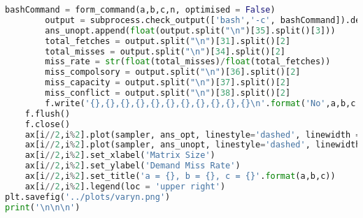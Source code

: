 \documentclass[12pt, a4paper]{article}
\begin{document}
\begin{lstlisting}[language=Python]
		bashCommand = form_command(a,b,c,n, optimised = False)
		output = subprocess.check_output(['bash','-c', bashCommand]).decode('utf8')
		ans_unopt.append(float(output.split("\n")[35].split()[3]))
		total_fetches = output.split("\n")[31].split()[2]
		total_misses = output.split("\n")[34].split()[2]
		miss_rate = str(float(total_misses)/float(total_fetches))
		miss_compolsory = output.split("\n")[36].split()[2]
		miss_capacity = output.split("\n")[37].split()[2]
		miss_conflict = output.split("\n")[38].split()[2]
		f.write('{},{},{},{},{},{},{},{},{},{},{}\n'.format('No',a,b,c,n,total_fetches,total_misses,miss_rate,miss_compolsory,miss_conflict,miss_capacity))
	f.flush()
	f.close()
	ax[i//2,i%2].plot(sampler, ans_opt, linestyle='dashed', linewidth = 2, marker='o', markersize=4,label='optimised')
	ax[i//2,i%2].plot(sampler, ans_unopt, linestyle='dashed', linewidth = 2, marker='o', markersize=4,label='unoptimised')
	ax[i//2,i%2].set_xlabel('Matrix Size')
	ax[i//2,i%2].set_ylabel('Demand Miss Rate')
	ax[i//2,i%2].set_title('a = {}, b = {}, c = {}'.format(a,b,c))
	ax[i//2,i%2].legend(loc = 'upper right')
plt.savefig('../plots/varyn.png')
print('\n\n\n')
\end{lstlisting}
\end{document}

